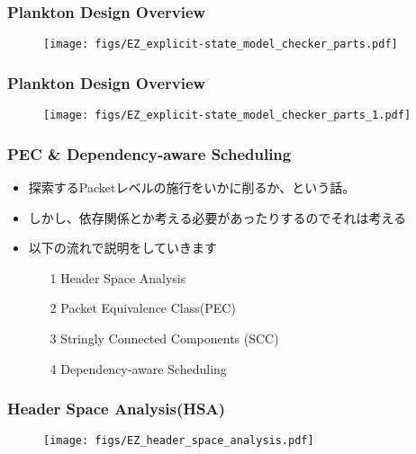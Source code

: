 \documentclass[dvipdfmx,9pt,notheorems]{beamer}
\theoremstyle{definition}
\begin{document}
\begin{frame}\frametitle{Plankton Design Overview}
  \begin{figure}[htb]
    \centering
    \texttt{[image: figs/EZ\_explicit-state\_model\_checker\_parts.pdf]}
  \end{figure}%
\end{frame}



\begin{frame}\frametitle{Plankton Design Overview}
  \begin{figure}[htb]
    \centering
		\texttt{[image: figs/EZ\_explicit-state\_model\_checker\_parts\_1.pdf]}
  \end{figure}%
\end{frame}


\begin{frame}\frametitle{PEC \& Dependency-aware Scheduling}
\begin{itemize}
	\item 探索するPacketレベルの施行をいかに削るか、という話。
	\item しかし、依存関係とか考える必要があったりするのでそれは考える
	\item 以下の流れで説明をしていきます
	\begin{itemize}
		\item[1] Header Space Analysis
		\item[2] Packet Equivalence Class(PEC)
		\item[3] Stringly Connected Components (SCC)
		\item[4] Dependency-aware Scheduling
	\end{itemize}
\end{itemize}
\pnote{
}
\end{frame}

\begin{frame}\frametitle{Header Space Analysis(HSA)}
  \begin{figure}[htb]
    \centering
    \texttt{[image: figs/EZ\_header\_space\_analysis.pdf]}
  \end{figure}%
\end{frame}
\end{document}
